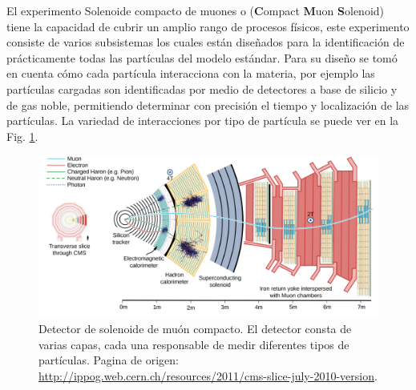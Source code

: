 El experimento Solenoide compacto de muones o \CMS(\textbf{C}ompact \textbf{M}uon \textbf{S}olenoid) tiene la capacidad de cubrir un amplio rango de procesos físicos, este experimento consiste de varios subsistemas los cuales están diseñados para la identificación de prácticamente todas las partículas del modelo estándar. Para su diseño se tomó en cuenta cómo cada partícula interacciona con la materia, por ejemplo las partículas cargadas son identificadas por medio de detectores a base de silicio y de gas noble, permitiendo determinar con precisión el tiempo y localización de las partículas. La variedad de interacciones por tipo de partícula se puede ver en la Fig. \ref{cms}.

\begin{figure}
\centering
\includegraphics[width=1\textwidth]{Analisis_y_Resultados/imagenes/CMS_interaction.png}
\caption{Detector de solenoide de muón compacto. El detector consta de varias capas, cada una responsable de medir diferentes tipos de partículas. Pagina de origen: \url{http://ippog.web.cern.ch/resources/2011/cms-slice-july-2010-version}.}
\label{cms}
\end{figure}

